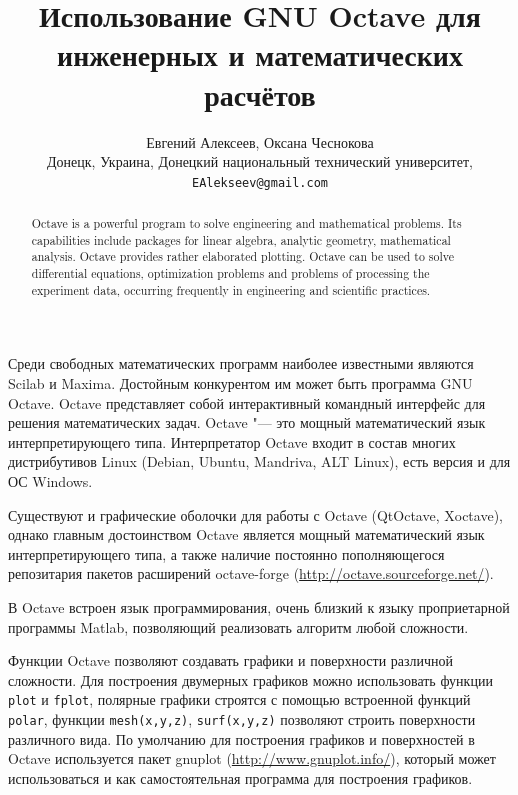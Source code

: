 \documentclass[10pt, a5paper]{article}
\begin{document}
\title{Использование GNU Octave для инженерных и математических расчётов}

\author{Евгений Алексеев, Оксана Чеснокова\\
\small Донецк, Украина, Донецкий национальный технический университет,\\ 
\small \texttt{EAlekseev@gmail.com}
}
\maketitle

\begin{abstract}
Octave is a powerful program to solve engineering and mathe\-matical problems. Its capabilities include packages for linear algebra, analytic geometry, mathematical analysis. Octave pro\-vides rather elaborated plotting. Octave can be used to solve differential equations, optimization problems and problems of processing the experiment data, occurring frequently in engi\-neering and scientific practices.
\end{abstract}

Среди свободных математических программ наиболее известными являются Scilab и Maxima. Достойным конкурентом им может быть программа GNU Octave. Octave представляет собой  интерактивный командный интерфейс для решения математических задач. Octave "--- это мощный математический язык  интерпретирующего типа. Интерпретатор Octave входит в состав многих дистрибутивов Linux (Debian, Ubuntu, Mandriva, ALT Linux), есть версия и для ОС Windows.

Существуют и графические оболочки для работы с Octave (Qt\-Octave, Xoctave), однако главным достоинством Octave является мощный математический язык интерпретирующего типа, а также наличие постоянно пополняющегося репозитария пакетов расширений octave-forge (\url{http://octave.sourceforge.net/}).

В Octave встроен язык программирования, очень близкий к языку проприетарной программы Matlab, позволяющий  реализовать алгоритм любой сложности.

Функции Octave позволяют создавать графики и поверхности различной сложности. Для построения двумерных графиков можно использовать функции \verb!plot! и \verb!fplot!, полярные графики строятся с помощью встроенной функций \verb!polar!, функции \verb!mesh(x,y,z)!, \verb!surf(x,y,z)! позволяют строить поверхности различного вида. По умолчанию для построения графиков и поверхностей в Octave используется пакет gnuplot (\url{http://www.gnuplot.info/}), который может использоваться и как самостоятельная программа для построения графиков.
\end{document}
